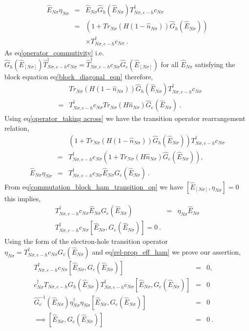 \documentclass[12pt,a4paper]{article}
\begin{document}
\begin{itemize}
\begin{eqnarray}
\hat{E}_{N\sigma}\eta_{N\sigma} &= &\hat{E}_{N\sigma}\hat{G}_{h}(\hat{E}_{N\sigma})T^{\dagger}_{N\sigma,e-h}c_{N\sigma}\nonumber\\
 &=& \left(1+Tr_{N\sigma}(H(1-\hat{n}_{N\sigma}))\hat{G}_{h}(\hat{E}_{N\sigma})\right)\nonumber\\
 &&\times T^{\dagger}_{N\sigma,e-h}c_{N\sigma}~.~~~~~
\end{eqnarray}
As eq\eqref{operator_commutivity} i.e. $\hat{G}_{h}(\hat{E}_{[N\sigma]})\hat{T}^{\dagger}_{N\sigma,e-h}c_{N\sigma} = \hat{T}^{\dagger}_{N\sigma,e-h}c_{N\sigma}\hat{G}_{e}(\hat{E}_{[N\sigma]})$ for all $\hat{E}_{N\sigma}$ satisfying the block equation eq\eqref{block_diagonal_eqn} therefore,
\begin{eqnarray}
&&Tr_{N\sigma}(H(1-\hat{n}_{N\sigma}))\hat{G}_{h}(\hat{E}_{N\sigma})T^{\dagger}_{N\sigma,e-h}c_{N\sigma}\nonumber\\
& =&T^{\dagger}_{N\sigma,e-h}c_{N\sigma}Tr_{N\sigma}(H\hat{n}_{N\sigma}) \hat{G}_{e}(\hat{E}_{N\sigma})~.\label{operator_taking across}
\end{eqnarray}
Using eq\eqref{operator_taking across} we have the transition operator rearrangement  relation,
\begin{eqnarray}
&&\left(1+Tr_{N\sigma}(H(1-\hat{n}_{N\sigma}))\hat{G}_{h}(\hat{E}_{N\sigma})\right)T^{\dagger}_{N\sigma,e-h}c_{N\sigma} \nonumber\\
&=&T^{\dagger}_{N\sigma,e-h}c_{N\sigma}\left(1+Tr_{N\sigma}(H\hat{n}_{N\sigma})\hat{G}_{e}(\hat{E}_{N\sigma})\right),~\nonumber\\
\hat{E}_{N\sigma}\eta_{N\sigma}&=&T^{\dagger}_{N\sigma,e-h}c_{N\sigma}\hat{E}_{N\sigma}G_{e}(\hat{E}_{N\sigma})~.
\end{eqnarray}
From eq\eqref{commutation_block_ham_transition_op} we have  $[\hat{E}_{[N\sigma]},\eta_{N\sigma}]=0$ this implies,
\begin{eqnarray}
T^{\dagger}_{N\sigma,e-h}c_{N\sigma}\hat{E}_{N\sigma}G_{e}(\hat{E}_{N\sigma}) &=& \eta_{N\sigma}\hat{E}_{N\sigma}\nonumber\\
T^{\dagger}_{N\sigma,e-h}c_{N\sigma}[\hat{E}_{N\sigma},G_{e}(\hat{E}_{N\sigma})]=0~.\label{rel-prop_eff_ham}
\end{eqnarray}
Using the form of the electron-hole transition operator $\eta_{N\sigma} =  T^{\dagger}_{N\sigma,e-h}c_{N\sigma}G_{e}(\hat{E}_{N\sigma})$ and eq\eqref{rel-prop_eff_ham} we prove our assertion, 
\begin{eqnarray}
T^{\dagger}_{N\sigma,e-h}c_{N\sigma}[\hat{E}_{N\sigma},G_{e}(\hat{E}_{N\sigma})] &=&0,\nonumber\\
c^{\dagger}_{N\sigma}T_{N\sigma,e-h}G_{h}(\hat{E}_{N\sigma})T^{\dagger}_{N\sigma,e-h}c_{N\sigma}[\hat{E}_{N\sigma},G_{e}(\hat{E}_{N\sigma})] &=&0\nonumber\\
\hat{G}^{-1}_{e}(\hat{E}_{N\sigma})\eta^{\dagger}_{N\sigma}\eta_{N\sigma}[\hat{E}_{N\sigma},G_{e}(\hat{E}_{N\sigma})] &=&0\nonumber\\
\implies [\hat{E}_{N\sigma},G_{e}(\hat{E}_{N\sigma})] &=& 0~.~~~~~\label{commutation of prop and eff ham}
\end{eqnarray}
\end{itemize}
\end{document}
